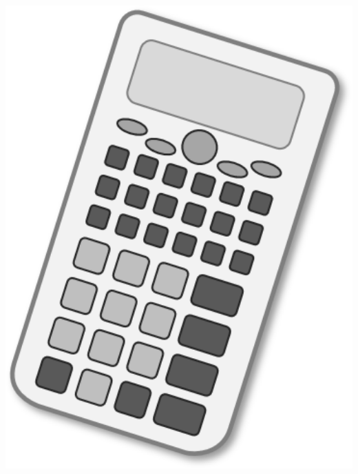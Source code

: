 \documentclass[a4paper,addpoints,12pt]{exam}
\begin{document}
\begin{adjustwidth}{0mm}{-10mm}
\begin{minipage}{\textwidth}
\begin{small}
\end{small}
\end{minipage}%
\begin{minipage}{.1\textwidth}
\vspace*{-50mm}\hspace*{-40mm}\includegraphics[width=1.5\textwidth]{../Images/Calculator.png}
\end{minipage}
\end{adjustwidth}

\newpage

\end{document}
